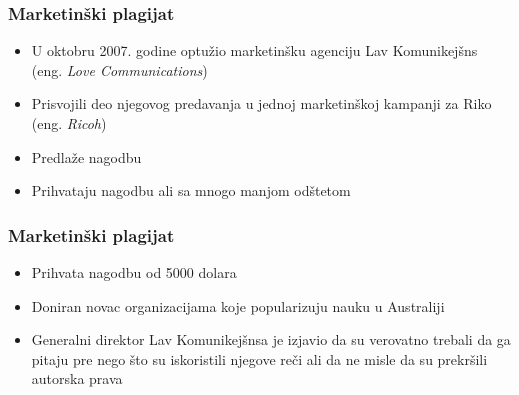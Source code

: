 \documentclass{beamer}
\begin{document}
\begin{frame}[fragile]\frametitle{Marketinški plagijat}
	\begin{itemize}
		\item U oktobru 2007. godine optužio marketinšku agenciju Lav Komunikejšns (eng. \textit{Love Communications})
		\item Prisvojili deo njegovog predavanja u jednoj marketinškoj kampanji za Riko (eng. \textit{Ricoh})
		\item Predlaže nagodbu
		\item Prihvataju nagodbu ali sa mnogo manjom odštetom
	\end{itemize}
\end{frame}

\begin{frame}[fragile]\frametitle{Marketinški plagijat}
	\begin{itemize}
		\item Prihvata nagodbu od 5000 dolara
		\item Doniran novac organizacijama koje popularizuju nauku u Australiji
		\item Generalni direktor Lav Komunikejšnsa je izjavio da su verovatno trebali da ga pitaju 
		pre nego što su iskoristili njegove reči ali da ne misle da su prekršili autorska prava
		
	\end{itemize}
\end{frame}

		


			

		
\end{document}
